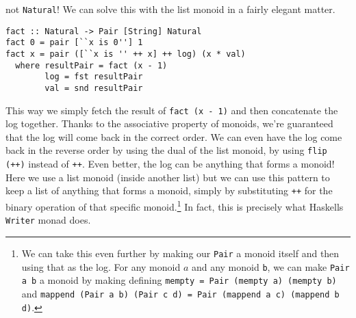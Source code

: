 \documentclass{acm_proc_article-sp}
\begin{document}
not \texttt{Natural}! We can solve this with the list monoid in a fairly
elegant matter.
\begin{lstlisting}
fact :: Natural -> Pair [String] Natural
fact 0 = pair [``x is 0''] 1
fact x = pair ([``x is '' ++ x] ++ log) (x * val)
  where resultPair = fact (x - 1)
        log = fst resultPair
        val = snd resultPair
\end{lstlisting}
This way we simply fetch the result of \texttt{fact (x - 1)} and then
concatenate the log together. Thanks to the associative property of
monoids, we're guaranteed that the log will come back in the correct
order. We can even have the log come back in the reverse order by
using the dual of the list monoid, by using \texttt{flip (++)} instead of
\texttt{++}. Even better, the log can be anything that forms a monoid! Here
we use a list monoid (inside another list) but we can use this pattern
to keep a list of anything that forms a monoid, simply by
substituting \texttt{++} for the binary operation of that specific
monoid.\footnote{We can take this even further by making our \texttt{Pair} a
  monoid itself and then using that as the log. For any monoid $a$ and
any monoid \texttt{b}, we can make \texttt{Pair a b} a monoid by making defining
\texttt{mempty = Pair (mempty a) (mempty b)} and \texttt{mappend (Pair a b) (Pair c
d) = Pair (mappend a c) (mappend b d)}.} In
fact, this is precisely what Haskells \texttt{Writer} monad does.
\end{document}
